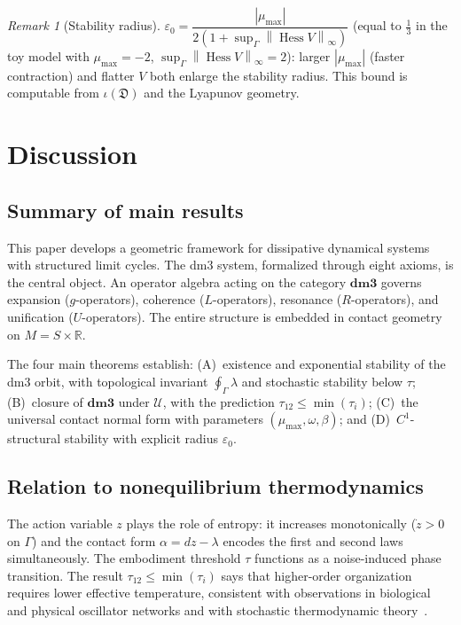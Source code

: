 \documentclass[12pt, oneside]{book}
\theoremstyle{plain}
\theoremstyle{definition}
\theoremstyle{remark}
\newtheorem{remark}{Remark}[section]
\newcommand{\R}{\mathbb{R}}
\newcommand{\dm}{\mathfrak{D}}
\newcommand{\dmcat}{\mathbf{dm3}}
\newcommand{\Orb}{\Gamma}
\newcommand{\cU}{\mathcal{U}}
\newcommand{\norm}[1]{\left\|#1\right\|}
\newcommand{\abs}[1]{\left|#1\right|}
\DeclareMathOperator{\Hess}{Hess}
\begin{document}
\begin{remark}[Stability radius]\label{rem:radius}
$\varepsilon_0=\dfrac{\abs{\mu_{\max}}}{2(1+\sup_\Orb\norm{\Hess V}_\infty)}$
(equal to $\tfrac{1}{3}$ in the toy model with $\mu_{\max}=-2$,
$\sup_\Orb\norm{\Hess V}_\infty=2$):
larger $\abs{\mu_{\max}}$ (faster contraction) and flatter $V$ both
enlarge the stability radius. This bound is computable from
$\iota(\dm)$ and the Lyapunov geometry.
\end{remark}

\section{Discussion}\label{sec:discussion}

\subsection{Summary of main results}

This paper develops a geometric framework for dissipative dynamical
systems with structured limit cycles. The dm3 system, formalized
through eight axioms, is the central object. An operator algebra
acting on the category $\dmcat$ governs expansion ($g$-operators),
coherence ($L$-operators), resonance ($R$-operators), and unification
($U$-operators). The entire structure is embedded in contact geometry
on $M=S\times\R$.

The four main theorems establish: (A)~existence and exponential
stability of the dm3 orbit, with topological invariant
$\oint_\Orb\lambda$ and stochastic stability below $\tau$;
(B)~closure of $\dmcat$ under $\cU$, with the prediction
$\tau_{12}\le\min(\tau_i)$; (C)~the universal contact normal form
with parameters $(\mu_{\max},\omega,\beta)$; and (D)~$C^1$-structural
stability with explicit radius $\varepsilon_0$.

\subsection{Relation to nonequilibrium thermodynamics}

The action variable $z$ plays the role of entropy: it increases
monotonically ($\dot z>0$ on $\Orb$) and the contact form
$\alpha=dz-\lambda$ encodes the first and second laws simultaneously.
The embodiment threshold $\tau$ functions as a noise-induced phase
transition. The result $\tau_{12}\le\min(\tau_i)$ says that
higher-order organization requires lower effective temperature,
consistent with observations in biological and physical oscillator
networks and with stochastic thermodynamic
theory~\cite{Hasminski,PRK}.
\end{document}
